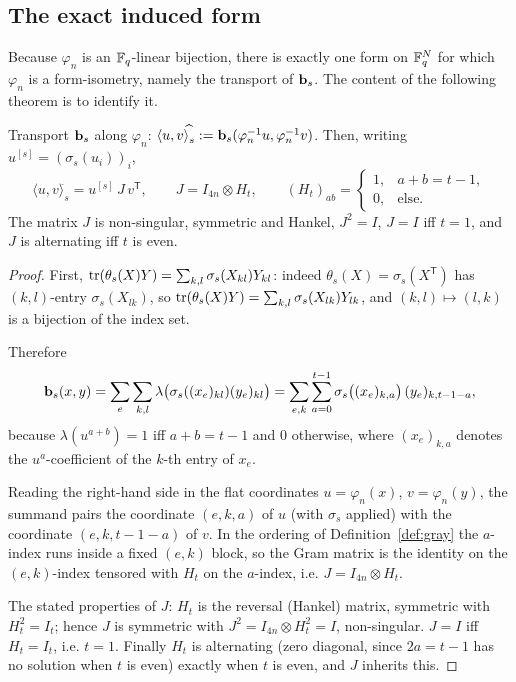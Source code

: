 \subsection{The exact induced form}\label{subsec:induced}

Because $\varphi_n$ is an $\mathbb F_q$-linear bijection, there is exactly one form on
$\mathbb F_q^{N}$ for which $\varphi_n$ is a form-isometry, namely the transport of
$\mathbf b_s$. The content of the following theorem is to identify it.

\begin{theorem}\label{thm:gram}
Transport $\mathbf b_s$ along $\varphi_n$:
$\langle u,v\rangle^{\widehat{}}_s:=\mathbf b_s(\varphi_n^{-1}u,\varphi_n^{-1}v)$.
Then, writing $u^{[s]}=(\sigma_s(u_i))_i$,
\[
  \langle u,v\rangle^{\widehat{}}_s=u^{[s]}\,J\,v^{\mathsf T},
  \qquad
  J=I_{4n}\otimes H_t,\qquad
  (H_t)_{ab}=\begin{cases}1,&a+b=t-1,\\0,&\text{else.}\end{cases}
\]
The matrix $J$ is non-singular, symmetric and Hankel, $J^2=I$,
$J=I$ iff $t=1$, and $J$ is alternating iff $t$ is even.
\end{theorem}

\begin{proof}
First, $\operatorname{tr}(\theta_s(X)Y)=\sum_{k,l}\sigma_s(X_{kl})Y_{kl}$: indeed
$\theta_s(X)=\sigma_s(X^{\mathsf T})$ has $(k,l)$-entry
$\sigma_s(X_{lk})$, so
$\operatorname{tr}(\theta_s(X)Y)=\sum_{k,l}\sigma_s(X_{lk})Y_{lk}$, and
$(k,l)\mapsto(l,k)$ is a bijection of the index set.

Therefore
\[
  \mathbf b_s(x,y)=\sum_e\sum_{k,l}
  \lambda\bigl(\sigma_s((x_e)_{kl})(y_e)_{kl}\bigr)
  =\sum_{e,k}\sum_{a=0}^{t-1}
  \sigma_s\bigl((x_e)_{k,a}\bigr)\,(y_e)_{k,t-1-a},
\]
because $\lambda(u^{a+b})=1$ iff $a+b=t-1$ and $0$ otherwise, where
$(x_e)_{k,a}$ denotes the $u^a$-coefficient of the $k$-th entry of $x_e$.

Reading the right-hand side in the flat coordinates
$u=\varphi_n(x)$, $v=\varphi_n(y)$, the summand pairs the coordinate
$(e,k,a)$ of $u$ (with $\sigma_s$ applied) with the coordinate
$(e,k,t-1-a)$ of $v$. In the ordering of Definition~\ref{def:gray} the
$a$-index runs inside a fixed $(e,k)$ block, so the Gram matrix is the identity
on the $(e,k)$-index tensored with $H_t$ on the $a$-index, i.e.
$J=I_{4n}\otimes H_t$.

The stated properties of $J$: $H_t$ is the reversal (Hankel) matrix, symmetric
with $H_t^2=I_t$; hence $J$ is symmetric with $J^2=I_{4n}\otimes H_t^2=I$,
non-singular. $J=I$ iff $H_t=I_t$, i.e. $t=1$. Finally $H_t$ is alternating
(zero diagonal, since $2a=t-1$ has no solution when $t$ is even) exactly when
$t$ is even, and $J$ inherits this.
\end{proof}


